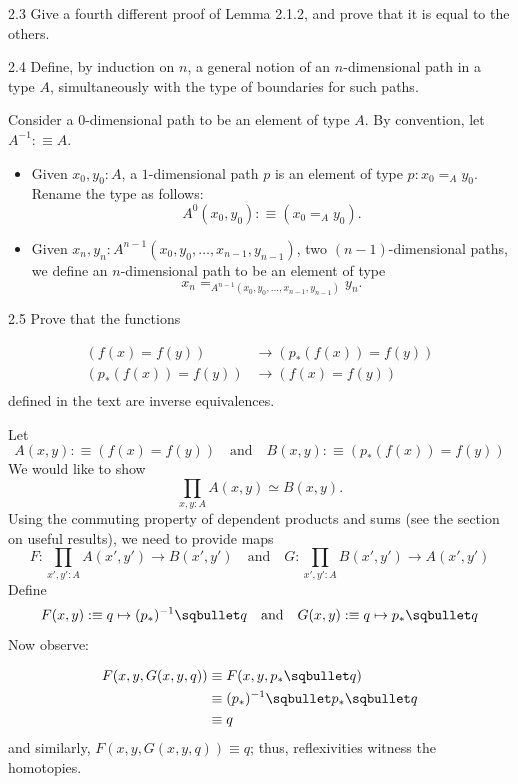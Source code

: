 \documentclass[14pt]{extarticle}
\newcommand{\0}{{\mathbf 0}}
\newcommand{\1}{{\mathbf 1}}
\newcommand{\2}{{\mathbf 2}}
\newcommand{\mt}{\mapsto}
\begin{document}
\begin{prob}{2.3}{}
Give a fourth different proof of Lemma 2.1.2, and prove that it is equal to the others.
\end{prob}

\begin{prob}{2.4}{}
Define, by induction on $n$, a general notion of an $n$-dimensional path in a type $A$, simultaneously with the type of boundaries for such paths.
\end{prob}
Consider a $0$-dimensional path to be an element of type $A$. By convention, let $A^{-1}:\equiv A$.

\begin{itemize}
\item Given $x_0,y_0 : A$, a $1$-dimensional path $p$ is an element of type $p : x_0=_Ay_0$. Rename the type as follows: \[A^0(x_0,y_0) :\equiv (x_0=_Ay_0).\]

\item Given $x_n,y_n : A^{n-1}(x_0, y_0, \ldots, x_{n-1},y_{n-1})$, two $(n-1)$-dimensional paths, we define an $n$-dimensional path to be an element of type \[x_n =_{A^{n-1}(x_0, y_0, \ldots, x_{n-1},y_{n-1})} y_n.\]
\end{itemize}

\begin{prob}{2.5}{}
Prove that the functions 

\begin{align*}
(f(x) = f(y)) &\to (p_*(f(x)) = f(y)) \\
(p_*(f(x)) = f(y)) &\to  (f(x) = f(y))\\
\end{align*}
defined in the text are inverse equivalences.
\end{prob}
Let 
\[A(x,y) : \equiv (f(x) = f(y)) \quad \text{and} \quad B(x,y) :\equiv (p_*(f(x)) = f(y))\]
We would like to show \[\prod_{x,y:A}A(x,y) \simeq B(x,y).\] Using the commuting property of dependent products and sums (see the section on useful results), we need to provide maps
\[F : \prod_{x',y':A}A(x',y') \to B(x',y') \quad \text{and} \quad G : \prod_{x',y':A} B(x',y') \to A(x',y')\]
Define 
\[F(x,y) :\equiv q \mt (p_*)^{-1} \sqbullet q \quad \text{and} \quad G(x,y) :\equiv q \mt p_* \sqbullet q\]
Now observe:

\begin{align*}
F(x,y,G(x,y,q))  &\equiv F(x,y,p_* \sqbullet q) \\
&\equiv (p_*)^{-1} \sqbullet p_* \sqbullet q \\
&\equiv q
\end{align*}
and similarly, $F(x,y,G(x,y,q)) \equiv q$; thus, reflexivities witness the homotopies.
\end{document}
